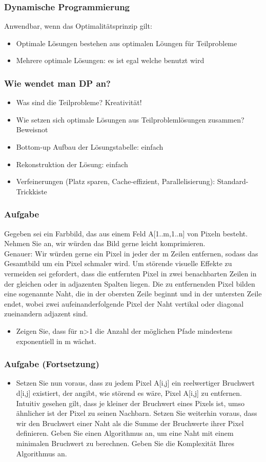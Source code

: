 \begin{frame}
\frametitle{Dynamische Programmierung}
Anwendbar, wenn das Optimalitätsprinzip gilt:
\begin{itemize}
\item Optimale Lösungen bestehen aus optimalen Löungen für Teilprobleme
\item Mehrere optimale Lösungen: es ist egal welche benutzt wird
\end{itemize}
\end{frame}

\begin{frame}
\frametitle{Wie wendet man DP an?}
\begin{itemize}
\item Was sind die Teilprobleme? Kreativität!
\item Wie setzen sich optimale Lösungen aus Teilproblemlösungen zusammen? Beweisnot
\item Bottom-up Aufbau der Lösungstabelle: einfach
\item Rekonstruktion der Lösung: einfach
\item Verfeinerungen (Platz sparen, Cache-effizient, Parallelisierung): Standard-Trickkiste
\end{itemize}
\end{frame}

\begin{frame}
\frametitle{Aufgabe}
Gegeben sei ein Farbbild, das aus einem Feld A[1..m,1..n] von Pixeln besteht. Nehmen Sie an, wir würden das Bild gerne leicht komprimieren.\\
Genauer: Wir würden gerne ein Pixel in jeder der m Zeilen entfernen, sodass das Gesamtbild um ein Pixel schmaler wird. Um störende visuelle Effekte zu vermeiden sei gefordert, dass die entfernten Pixel in zwei benachbarten Zeilen in der gleichen oder in adjazenten Spalten liegen. Die zu entfernenden Pixel bilden eine sogenannte Naht, die in der obersten Zeile beginnt und in der untersten Zeile endet, wobei zwei aufeinanderfolgende Pixel der Naht vertikal oder diagonal
zueinandern adjazent sind.
\begin{itemize}
\item Zeigen Sie, dass für n>1 die Anzahl der möglichen Pfade mindestens exponentiell in m wächst.
\end{itemize}
\end{frame}

\begin{frame}
\frametitle{Aufgabe (Fortsetzung)}
\begin{itemize}
\item  Setzen Sie nun voraus, dass zu jedem Pixel A[i,j] ein reelwertiger Bruchwert d[i,j] existiert, der angibt, wie störend es wäre, Pixel A[i,j] zu entfernen. Intuitiv gesehen gilt, dass je kleiner der Bruchwert eines Pixels ist, umso ähnlicher ist der Pixel zu seinen Nachbarn. Setzen Sie weiterhin voraus, dass wir den Bruchwert einer Naht als die Summe der Bruchwerte ihrer Pixel definieren. Geben Sie einen Algorithmus an, um eine Naht mit einem minimalen Bruchwert zu berechnen. Geben Sie die Komplexität Ihres Algorithmus an.
\end{itemize}
\end{frame}

